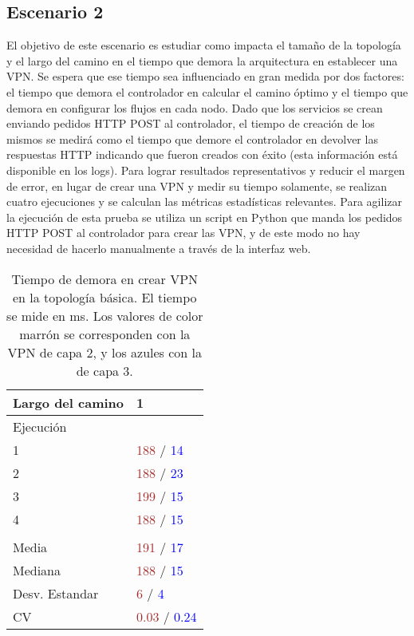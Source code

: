 \subsection{Escenario 2}
El objetivo de este escenario es estudiar como impacta el tamaño de la topología y el largo del camino en el tiempo que demora la arquitectura en establecer una VPN. Se espera que ese tiempo sea influenciado en gran medida por dos factores: el tiempo que demora el controlador en calcular el camino óptimo y el tiempo que demora en configurar los flujos en cada nodo. Dado que los servicios se crean enviando pedidos HTTP POST al controlador, el tiempo de creación de los mismos se medirá como el tiempo que demore el controlador en devolver las respuestas HTTP indicando que fueron creados con éxito (esta información está disponible en los logs). Para lograr resultados representativos y reducir el margen de error, en lugar de crear una VPN y medir su tiempo solamente, se realizan cuatro ejecuciones y se calculan las métricas estadísticas relevantes. Para agilizar la ejecución de esta prueba se utiliza un script en Python que manda los pedidos HTTP POST al controlador para crear las VPN, y de este modo no hay necesidad de hacerlo manualmente a través de la interfaz web.
\begin{table}[!h]
	\caption{Tiempo de demora en crear VPN en la topología básica. El tiempo se mide en ms. Los valores de color marrón se corresponden con la VPN de capa 2, y los azules con la de capa 3.}
	\centering 
	\begin{tabular}{p{3.2cm} p{1.8cm}}
		\hline
		Largo del camino & 1 \\ [0.5ex]
		\hline
		Ejecución & \\
		1 & \textcolor{brown}{188} / \textcolor{blue}{14} \\
		2 & \textcolor{brown}{188} / \textcolor{blue}{23} \\
		3 & \textcolor{brown}{199} / \textcolor{blue}{15} \\
		4 & \textcolor{brown}{188} / \textcolor{blue}{15} \\
		& \\
		Media & \textcolor{brown}{191} / \textcolor{blue}{17} \\
		Mediana & \textcolor{brown}{188} / \textcolor{blue}{15} \\
		Desv. Estandar & \textcolor{brown}{6} / \textcolor{blue}{4} \\
		CV & \textcolor{brown}{0.03} / \textcolor{blue}{0.24} \\ [1ex]
		\hline
	\end{tabular}
	\label{table:tiempo_topo_basica}
\end{table}

